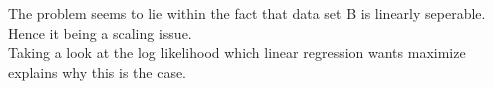 \begin{answer}
    The problem seems to lie within the fact that data set B is linearly seperable. Hence it being a scaling issue.\\
    Taking a look at the log likelihood which linear regression wants maximize explains why this is the case.
\end{answer}
